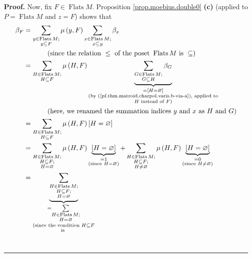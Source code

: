 \documentclass[numbers=enddot,12pt,final,onecolumn,notitlepage]{scrartcl}%
\theoremstyle{definition}
\newenvironment{proof}[1][Proof]{\noindent\textbf{#1.} }{\ \rule{0.5em}{0.5em}}
\let\sumnonlimits\sum
\renewcommand{\sum}{\sumnonlimits\limits}
\begin{document}
\begin{proof}
Now, fix $F\in\operatorname*{Flats}M$. Proposition \ref{prop.moebius.double0}
\textbf{(c)} (applied to $P=\operatorname*{Flats}M$ and $z=F$) shows that%
\begin{align}
\beta_{F}  &  =\sum_{\substack{y\in\operatorname*{Flats}M;\\y\subseteq F}%
}\mu\left(  y,F\right)  \sum_{\substack{x\in\operatorname*{Flats}%
M;\\x\subseteq y}}\beta_{x}\nonumber\\
&  \ \ \ \ \ \ \ \ \ \ \left(  \text{since the relation }\leq\text{ of the
poset }\operatorname*{Flats}M\text{ is }\subseteq\right) \nonumber\\
&  =\sum_{\substack{H\in\operatorname*{Flats}M;\\H\subseteq F}}\mu\left(
H,F\right)  \underbrace{\sum_{\substack{G\in\operatorname*{Flats}%
M;\\G\subseteq H}}\beta_{G}}_{\substack{=\left[  H=\varnothing\right]
\\\text{(by (\ref{pf.thm.matroid.charpol.varis.b-via-a}), applied to}\\H\text{
instead of }F\text{)}}}\nonumber\\
&  \ \ \ \ \ \ \ \ \ \ \left(  \text{here, we renamed the summation indices
}y\text{ and }x\text{ as }H\text{ and }G\right) \nonumber\\
&  =\sum_{\substack{H\in\operatorname*{Flats}M;\\H\subseteq F}}\mu\left(
H,F\right)  \left[  H=\varnothing\right] \nonumber\\
&  =\sum_{\substack{H\in\operatorname*{Flats}M;\\H\subseteq F;\\H=\varnothing
}}\mu\left(  H,F\right)  \underbrace{\left[  H=\varnothing\right]
}_{\substack{=1\\\text{(since }H=\varnothing\text{)}}}+\sum_{\substack{H\in
\operatorname*{Flats}M;\\H\subseteq F;\\H\neq\varnothing}}\mu\left(
H,F\right)  \underbrace{\left[  H=\varnothing\right]  }%
_{\substack{=0\\\text{(since }H\neq\varnothing\text{)}}}\nonumber\\
&  =\underbrace{\sum_{\substack{H\in\operatorname*{Flats}M;\\H\subseteq
F;\\H=\varnothing}}}_{\substack{=\sum_{\substack{H\in\operatorname*{Flats}%
M;\\H=\varnothing}}\\\text{(since the condition }H\subseteq F\\\text{is
}}}
\end{align}
\end{proof}
\end{document}
